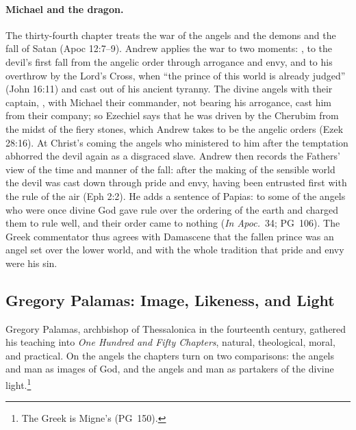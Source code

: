 \paragraph{Michael and the dragon.} The thirty-fourth chapter treats the war
of the angels and the demons and the fall of Satan (Apoc 12:7--9).
Andrew applies the war to two moments: , to the devil's first fall from the
angelic order through arrogance and envy, and to his overthrow by the
Lord's Cross, when ``the prince of this world is already judged'' (John 16:11) and
cast out of his ancient tyranny. The divine angels with their captain,
, with Michael their commander, not
bearing his arrogance, cast him from their company; so Ezechiel says that he
was driven by the Cherubim from the midst of the fiery stones, which Andrew
takes to be the angelic orders (Ezek 28:16). At Christ's coming the angels
who ministered to him after the temptation abhorred the devil again as a
disgraced slave. Andrew then records the Fathers' view of the time and
manner of the fall: after the making of the sensible world the devil was
cast down through pride and envy, having been entrusted first with the rule
of the air (Eph 2:2). He adds a sentence of Papias: to some of the angels
who were once divine God gave rule over the ordering of the earth and
charged them to rule well, and their order came to nothing (\emph{In
Apoc.}\ 34; PG~106). The Greek commentator thus agrees with Damascene that
the fallen prince was an angel set over the lower world, and with the whole
tradition that pride and envy were his sin.

\sectionguard
\subsection{Gregory Palamas: Image, Likeness, and Light}\label{sec:bz-palamas}

Gregory Palamas, archbishop of Thessalonica in the fourteenth century,
gathered his teaching into \emph{One Hundred and Fifty Chapters}, natural,
theological, moral, and practical. On the angels the chapters turn on two comparisons: the angels and man as images of God, and
the angels and man as partakers of the divine light.\footnote{The Greek
is Migne's (PG~150).}


